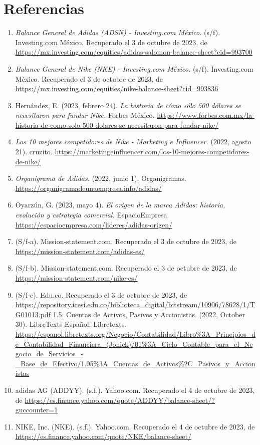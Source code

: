\documentclass[a4paper,12pt]{article}
\begin{document}
\clearpage

\section{Referencias}
\begin{enumerate}
\item \textit{Balance General de Adidas (ADSN) - Investing.com México.} (s/f). Investing.com México. Recuperado el 3 de octubre de 2023, de \url{https://mx.investing.com/equities/adidas-salomon-balance-sheet?cid=993700}
\item \textit{Balance General de Nike (NKE) - Investing.com México.} (s/f). Investing.com México. Recuperado el 3 de octubre de 2023, de \url{https://mx.investing.com/equities/nike-balance-sheet?cid=993836}
\item Hernández, E. (2023, febrero 24). \textit{La historia de cómo sólo 500 dólares se necesitaron para fundar Nike.} Forbes México. \url{https://www.forbes.com.mx/la-historia-de-como-solo-500-dolares-se-necesitaron-para-fundar-nike/}
\item \textit{Los 10 mejores competidores de Nike - Marketing e Influencer.} (2022, agosto 21). cruzito. \url{https://marketingeinfluencer.com/los-10-mejores-competidores-de-nike/}
\item \textit{Organigrama de Adidas.} (2022, junio 1). Organigramas. \url{https://organigramadeunaempresa.info/adidas/}
\item Oyarzún, G. (2023, mayo 4). \textit{El origen de la marca Adidas: historia, evolución y estrategia comercial.} EspacioEmpresa. \url{https://espacioempresa.com/lideres/adidas-origen/}
\item (S/f-a). Mission-statement.com. Recuperado el 3 de octubre de 2023, de \url{https://mission-statement.com/adidas-es/}
\item (S/f-b). Mission-statement.com. Recuperado el 3 de octubre de 2023, de \url{https://mission-statement.com/nike-es/}
\item (S/f-c). Edu.co. Recuperado el 3 de octubre de 2023, de \url{https://repository.icesi.edu.co/biblioteca_digital/bitstream/10906/78628/1/TG01013.pdf}
1.5: Cuentas de Activos, Pasivos y Accionistas. (2022, October 30). LibreTexts Español; Libretexts. \url{https://espanol.libretexts.org/Negocio/Contabilidad/Libro%3A_Principios_de_Contabilidad_Financiera_(Jonick)/01%3A_Ciclo_Contable_para_el_Negocio_de_Servicios_-_Base_de_Efectivo/1.05%3A_Cuentas_de_Activos%2C_Pasivos_y_Accionistas}

\item adidas AG (ADDYY). (s.f.). Yahoo.com. Recuperado el 4 de octubre de 2023, de \url{https://es.finance.yahoo.com/quote/ADDYY/balance-sheet/?guccounter=1}

\item NIKE, Inc. (NKE). (s.f.). Yahoo.com. Recuperado el 4 de octubre de 2023, de \url{https://es.finance.yahoo.com/quote/NKE/balance-sheet/}

\end{enumerate}
\end{document}

